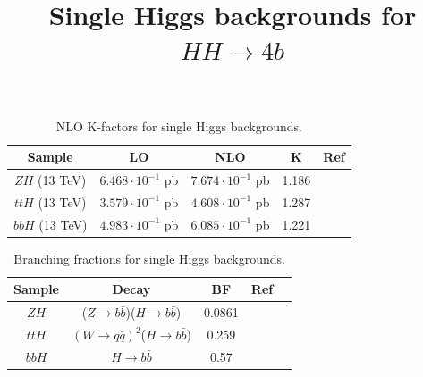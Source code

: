 \documentclass[11pt]{article}
\title{Single Higgs backgrounds for $HH\to4b$}
\begin{document}
\maketitle

\begin{table}[htp]
\begin{center}
\begin{tabular}{|c|c|c|c|c|}
\hline
Sample & LO & NLO & K & Ref\\
\hline\hline
$ZH$ (13 TeV) & $6.468 \cdot 10^{-1}$ pb & $ 7.674 \cdot 10^{-1}$ pb & 1.186 & \cite{Alwall:2014hca}\\
$ttH$ (13 TeV) & $3.579 \cdot 10^{-1}$ pb & $4.608 \cdot 10^{-1}$ pb & 1.287 &  \cite{Alwall:2014hca}\\
$bbH$ (13 TeV) &  $4.983 \cdot 10^{-1}$ pb & $6.085 \cdot 10^{-1}$ pb & 1.221 & \cite{Alwall:2014hca}\\
\hline
\end{tabular}
\end{center}
\label{HK}
\caption{NLO K-factors for single Higgs backgrounds.}
\end{table}%

\begin{table}[htp]
\begin{center}
\begin{tabular}{|c|c|c|c|c|}
\hline
Sample & Decay & BF & Ref\\
\hline\hline
$ZH$ & ($Z\to b\bar{b}$)($H\to b\bar{b}$) & 0.0861 & \cite{Agashe:2014kda}\\
$ttH$ & $(W\to q\bar{q})^2$($H\to b\bar{b}$) & 0.259 & \cite{Agashe:2014kda}\\
$bbH$ & $H\to b\bar{b}$ & 0.57 & \cite{Agashe:2014kda} \\
\hline
\end{tabular}
\end{center}
\label{HBF}
\caption{Branching fractions for single Higgs backgrounds.}
\end{table}%
\end{document}
